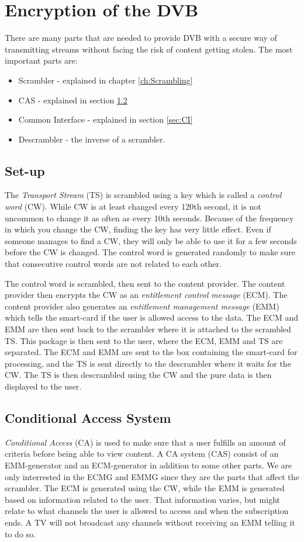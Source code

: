 \chapter{Encryption of the DVB}
There are many parts that are needed to provide DVB with a secure way of 
transmitting streams without facing the risk of content getting stolen. The 
most important parts are:

\begin{itemize}
\item Scrambler - explained in chapter \ref{ch:Scrambling}
\item CAS - explained in section \ref{sec:CAS}
\item Common Interface - explained in section \ref{sec:CI}
\item Descrambler - the inverse of a scrambler.
\end{itemize}

\section{Set-up} \label{sec:setup}
The \emph{Transport Stream} (TS) is scrambled using a key which is called a 
\emph{control word} (CW). While CW is at least changed every 120th second, it is 
not uncommon to change it as often as every 10th seconds. Because of the 
frequency in which you change the CW, finding the key has very little effect. 
Even if someone manages to find a CW, they will only be able to use it for a few 
seconds before the CW is changed. The control word is generated randomly to make 
sure that consecutive control words are not related to each other. 

The control word is scrambled, then sent to the content provider. The content 
provider then encrypts the CW as an \emph{entitlement control message} (ECM). 
The content provider also generates an \emph{entitlement management message} 
(EMM) which tells the smart-card if the user is allowed access to the data. The 
ECM and EMM are then sent back to the scrambler where it is attached to the 
scrambled TS. This package is then sent to the user, where the ECM, EMM and TS 
are separated. The ECM and EMM are sent to the box containing the smart-card 
for processing, and the TS is sent directly to the descrambler where it waits 
for the CW. The TS is then descrambled using the CW and the pure data is then 
displayed to the user.

\section{Conditional Access System} \label{sec:CAS}
\emph{Conditional Access} (CA) is used to make sure that a user fulfills an 
amount of criteria before being able to view content. A CA system (CAS) consist 
of an EMM-generator and an ECM-generator in addition to some other parts. We are 
only interrested in the ECMG and EMMG since they are the parts that affect the 
scrambler. The ECM is generated using the CW, while the EMM is generated based 
on information related to the user. That information varies, but might relate to 
what channels the user is allowed to access and when the subscription ends. A 
TV will not broadcast any channels without receiving an EMM telling it to do so.


